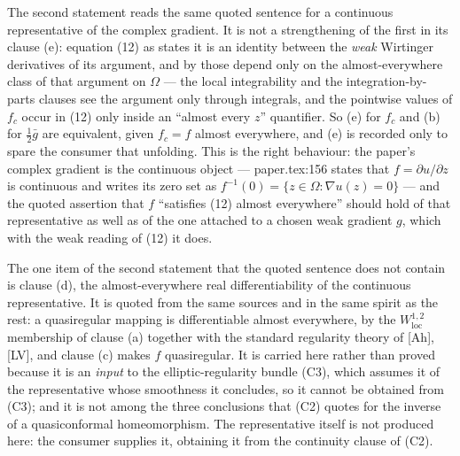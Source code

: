 \begin{definition}
The second statement reads the same quoted sentence for a continuous
representative of the complex gradient.  It is not a strengthening of the
first in its clause (e): equation (12) as  states it is an
identity between the \emph{weak} Wirtinger derivatives of its argument, and by
 those depend only on the almost-everywhere class
of that argument on $\Omega$ --- the local integrability and the
integration-by-parts clauses see the argument only through integrals, and the
pointwise values of $f_c$ occur in (12) only inside an ``almost every $z$''
quantifier.  So (e) for $f_c$ and (b) for $\tfrac12\bar g$ are equivalent,
given $f_c=f$ almost everywhere, and (e) is recorded only to spare the
consumer that unfolding.  This is the right behaviour: the paper's complex
gradient is the continuous object --- paper.tex:156 states that
$f=\partial u/\partial z$ is continuous and writes its zero set as
$f^{-1}(0)=\{z\in\Omega:\nabla u(z)=0\}$ --- and the quoted assertion that $f$
``satisfies (12) almost everywhere'' should hold of that representative as
well as of the one attached to a chosen weak gradient $g$, which with the weak
reading of (12) it does.

The one item of the second statement that the quoted sentence does not contain
is clause (d), the almost-everywhere real differentiability of the continuous
representative.  It is quoted from the same sources and in the same spirit as
the rest: a quasiregular mapping is differentiable almost everywhere, by the
$W^{1,2}_{\mathrm{loc}}$ membership of clause (a) together with the standard
regularity theory of [Ah], [LV], and clause (c) makes $f$ quasiregular.  It is
carried here rather than proved because it is an \emph{input} to the
elliptic-regularity bundle (C3), which assumes it of the representative whose
smoothness it concludes, so it cannot be obtained from (C3); and it is not
among the three conclusions that (C2) quotes for the inverse of a
quasiconformal homeomorphism.  The representative itself is not produced here:
the consumer supplies it, obtaining it from the continuity clause of (C2).
\end{definition}
